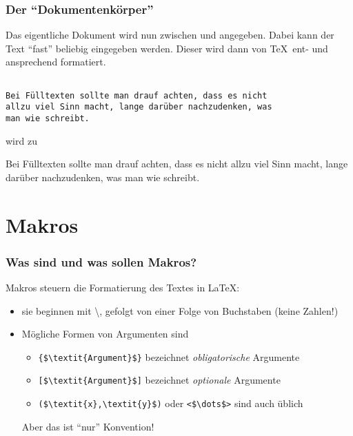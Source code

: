 \begin{frame}[fragile]
  \frametitle{Der \enquote{Dokumentenkörper}}

  Das eigentliche Dokument wird nun zwischen \lstinline!! und
    \lstinline!! angegeben.  Dabei kann der Text \enquote{fast} beliebig
  eingegeben werden.  Dieser wird dann von \TeX\ ent- und ansprechend formatiert.

\begin{lstlisting}

Bei Fülltexten sollte man drauf achten, dass es nicht
allzu viel Sinn macht, lange darüber nachzudenken, was
man wie schreibt.

\end{lstlisting}

  wird zu

  \begin{center}
    \parbox{0.8\linewidth}{\rm Bei Fülltexten sollte man drauf achten, dass es
      nicht allzu viel Sinn macht, lange darüber nachzudenken, was man wie schreibt.}
  \end{center}

\end{frame}
\section{Makros}

\begin{frame}[fragile]
  \frametitle{Was sind und was sollen Makros?}

  \onslide<+->

  Makros steuern die Formatierung des Textes in \LaTeX:

  \begin{itemize}
  \item<+-> sie beginnen mit \textbackslash, gefolgt von einer Folge von Buchstaben (keine
    Zahlen!)
  \item<+-> Mögliche Formen von Argumenten sind
    \begin{itemize}
    \item \lstinline!{$\textit{Argument}$}! bezeichnet \emph{obligatorische} Argumente
    \item \lstinline![$\textit{Argument}$]! bezeichnet \emph{optionale} Argumente
    \item \lstinline!($\textit{x},\textit{y}$)! oder \lstinline!<$\dots$>! sind auch
      üblich
    \end{itemize}

    Aber das ist \enquote{nur} Konvention!
  \end{itemize}
\end{frame}

